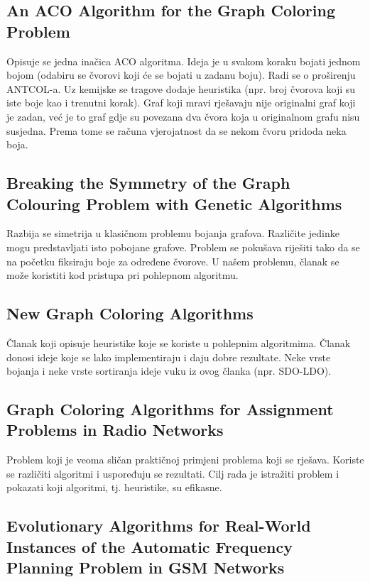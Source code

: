 \documentclass[times, utf8, diplomski, numeric]{fer}
\begin{document}
\subsection*{An ACO Algorithm for the Graph Coloring Problem \cite{lit4}}

Opisuje se jedna inačica ACO  algoritma. Ideja je u svakom koraku bojati 
jednom bojom (odabiru se čvorovi koji će se bojati u zadanu boju). Radi se o 
proširenju ANTCOL-a. Uz kemijske se tragove dodaje heuristika (npr. 
broj čvorova koji su iste boje kao i trenutni korak). Graf koji mravi rješavaju
nije originalni graf koji je zadan, već je to graf gdje su povezana dva čvora
koja u originalnom grafu nisu susjedna. Prema tome se računa vjerojatnost da 
se nekom čvoru pridoda neka boja. 


\subsection*{Breaking the Symmetry of the Graph Colouring Problem with Genetic Algorithms \cite{lit5}}

Razbija se simetrija u klasičnom problemu bojanja grafova. Različite jedinke mogu predstavljati isto pobojane grafove. Problem se pokušava riješiti tako  da se na početku fiksiraju boje za određene čvorove. U našem problemu, članak se može koristiti kod pristupa pri pohlepnom algoritmu.

\subsection*{New Graph Coloring Algorithms \cite{lit7}}

Članak koji opisuje heuristike koje se koriste u pohlepnim algoritmima. Članak donosi ideje koje se lako implementiraju i daju dobre rezultate. Neke vrste bojanja i neke vrste sortiranja ideje vuku iz ovog članka (npr. SDO-LDO).

\subsection*{Graph Coloring Algorithms for Assignment Problems in Radio Networks \cite{lit10}}

Problem koji je veoma sličan praktičnoj primjeni problema koji se rješava. Koriste se različiti algoritmi i uspoređuju se rezultati. Cilj rada je istražiti problem i pokazati koji algoritmi, tj. heuristike, su efikasne.

\subsection*{Evolutionary Algorithms for Real-World Instances of the Automatic Frequency Planning Problem in GSM Networks \cite{lit12}}
\end{document}
